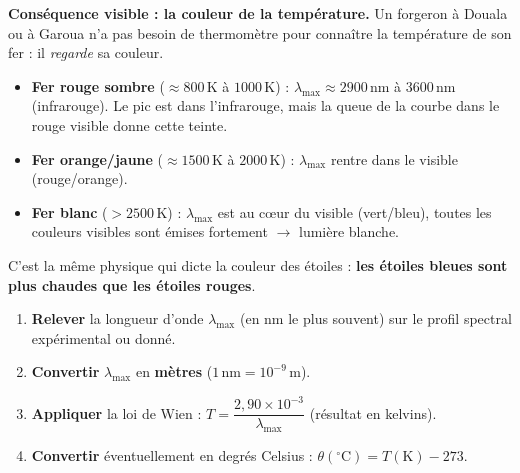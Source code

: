 \documentclass[11pt]{article}
\begin{document}
\textbf{Conséquence visible : la couleur de la température.}
Un forgeron à Douala ou à Garoua n'a pas besoin de thermomètre pour connaître la température de son fer : il \emph{regarde} sa couleur.
\begin{itemize}
    \item \textbf{Fer rouge sombre} ($\approx 800\,\text{K}$ à $1000\,\text{K}$) : $\lambda_{\text{max}} \approx 2900\,\text{nm}$ à $3600\,\text{nm}$ (infrarouge). Le pic est dans l'infrarouge, mais la queue de la courbe dans le rouge visible donne cette teinte.
    \item \textbf{Fer orange/jaune} ($\approx 1500\,\text{K}$ à $2000\,\text{K}$) : $\lambda_{\text{max}}$ rentre dans le visible (rouge/orange).
    \item \textbf{Fer blanc} ($> 2500\,\text{K}$) : $\lambda_{\text{max}}$ est au cœur du visible (vert/bleu), toutes les couleurs visibles sont émises fortement $\rightarrow$ lumière blanche.
\end{itemize}
C'est la même physique qui dicte la couleur des étoiles : \textbf{les étoiles bleues sont plus chaudes que les étoiles rouges}.

\begin{methode}
\begin{enumerate}
    \item \textbf{Relever} la longueur d'onde $\lambda_{\text{max}}$ (en nm le plus souvent) sur le profil spectral expérimental ou donné.
    \item \textbf{Convertir} $\lambda_{\text{max}}$ en \textbf{mètres} ($1\,\text{nm} = 10^{-9}\,\text{m}$).
    \item \textbf{Appliquer} la loi de Wien : $T = \dfrac{2,90 \times 10^{-3}}{\lambda_{\text{max}}}$ (résultat en kelvins).
    \item \textbf{Convertir} éventuellement en degrés Celsius : $\theta(^\circ\text{C}) = T(\text{K}) - 273$.
\end{enumerate}
\end{methode}
\end{document}
